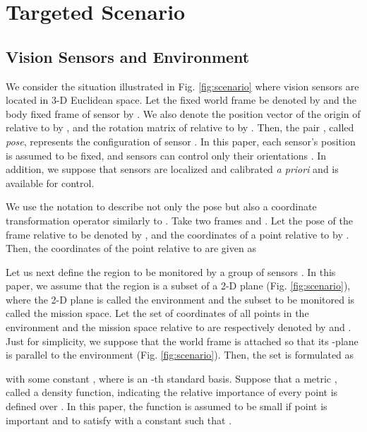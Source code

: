 \documentclass[conference,letterpaper]{ieeeconf}
\begin{document}
\section{Targeted Scenario}


\subsection{Vision Sensors and Environment}





We consider the situation illustrated in Fig. \ref{fig:scenario} where
 vision sensors  are located in 3-D Euclidean space.
Let the fixed world frame be denoted by 
 and the body fixed frame of sensor 
by .
We also denote the position vector of the origin of 
relative to  by ,
and the rotation matrix of  relative to 
by .
Then, the pair ,
called {\it pose}, represents
the configuration of sensor .
In this paper, each sensor's position  is assumed to be fixed,
and sensors can control only their orientations .
In addition, we suppose that sensors are localized and calibrated {\it a priori}
and  is available for control.






We use the notation  to describe not only the pose
but also a coordinate transformation operator similarly to \cite{MLS_BK}.
Take two frames  and . 
Let the pose of the frame  relative to  be denoted by ,
and the coordinates of a point relative to  by .
Then, the coordinates  of the point relative to  are 
given as








Let us next define the region to be monitored by a group of sensors .
In this paper, we assume that 
the region is a subset of a 2-D plane (Fig. \ref{fig:scenario}), where the 
2-D plane is called the environment and the subset to be monitored
is called the mission space.
Let the set of coordinates of all points in the environment and the mission space 
relative to  are respectively 
denoted by  and .
Just for simplicity, we suppose that 
the world frame  is attached so that its
-plane is parallel to the environment
(Fig. \ref{fig:scenario}).
Then, the set  is formulated as 

with some constant ,
where  is an -th standard basis.
Suppose that a metric ,
called a density function, indicating the relative importance of 
every point  is defined over .
In this paper, the function  is assumed to be small if point  is important
and to satisfy  with a constant
 such that .
\end{document}
